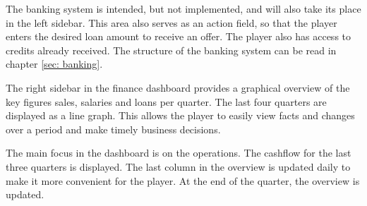 The banking system is intended, but not implemented, and will also take its place in the left sidebar. This area also serves as an action field, so that the player enters the desired loan amount to receive an offer. The player also has access to credits already received. The structure of the banking system can be read in chapter \ref{sec: banking}. 

The right sidebar in the finance dashboard provides a graphical overview of the key figures sales, salaries and loans per quarter. The last four quarters are displayed as a line graph. This allows the player to easily view facts and changes over a period and make timely business decisions. 

The main focus in the dashboard is on the operations. The cashflow for the last three quarters is displayed. The last column in the overview is updated daily to make it more convenient for the player. At the end of the quarter, the overview is updated. 
